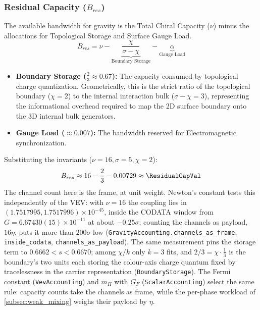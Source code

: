 \subsubsection{Residual Capacity (\texorpdfstring{$B_{res}$}{Bres})}
The available bandwidth for gravity is the Total Chiral Capacity ($\nu$) minus the allocations for Topological Storage and Surface Gauge Load.
\begin{equation}
B_{res} = \nu - \underbrace{\frac{\chi}{\sigma-\chi}}_{\text{Boundary Storage}} - \underbrace{\alpha}_{\text{Gauge Load}}
\end{equation}
\begin{itemize}
    \item \textbf{Boundary Storage ($\frac{2}{3} \approx 0.67$):} The capacity consumed by topological charge quantization. Geometrically, this is the strict ratio of the topological boundary ($\chi=2$) to the internal interaction bulk ($\sigma-\chi=3$), representing the informational overhead required to map the 2D surface boundary onto the 3D internal bulk generators.
    \item \textbf{Gauge Load ($\approx 0.007$):} The bandwidth reserved for Electromagnetic synchronization.
\end{itemize}
Substituting the invariants ($\nu=16, \sigma=5, \chi=2$):
\begin{equation}
B_{res} \approx 16 - \frac{2}{3} - 0.00729 \approx \mathbf{\ResidualCapVal}
\end{equation}
The channel count here is the frame, at unit weight. Newton's constant tests this independently of the VEV: with $\nu=16$ the coupling lies in $(1.7517995,1.7517996)\times10^{-45}$, inside the CODATA window from $G=6.67430(15)\times10^{-11}$ at about $-0.25\sigma$; counting the channels as payload, $16\eta$, puts it more than $200\sigma$ low (\texttt{GravityAccounting.channels\_as\_frame}, \texttt{inside\_codata}, \texttt{channels\_as\_payload}). The same measurement pins the storage term to $0.6662<s<0.6670$; among $\chi/k$ only $k=3$ fits, and $2/3=\chi\cdot\tfrac13$ is the boundary's two units each storing the colour-axis charge quantum fixed by tracelessness in the carrier representation (\texttt{BoundaryStorage}). The Fermi constant (\texttt{VevAccounting}) and $m_H$ with $G_F$ (\texttt{ScalarAccounting}) select the same rule: capacity counts take the channels as frame, while the per-phase workload of \cref{subsec:weak_mixing} weighs their payload by $\eta$.

